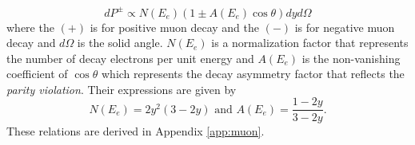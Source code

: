 \documentclass{outhesis}
\begin{document}
\begin{equation}
dP^{\pm} \propto N\left(E_e\right)\left(1 \pm A(E_e)\cos \theta \right) dy d\Omega
\label{eq:prob}
\end{equation}
where the $(+)$ is for positive muon decay and the $(-)$ is for negative muon decay and $d\Omega$ is the solid angle. $N\left(E_e\right)$ is a normalization factor that represents the number of decay electrons per unit energy and $A\left(E_e\right)$ is the non-vanishing coefficient of $\cos \theta$ which represents the decay asymmetry factor that reflects the \emph{parity violation}. Their expressions are given by
\begin{equation}
N\left(E_e\right) = 2y^2\left(3-2y\right)  \,\,  \text{and}  \,\,  A\left(E_e\right) = \frac{1-2y}{3-2y}.
\label{eq:na}
\end{equation}
These relations are derived in Appendix \ref{app:muon}.
\end{document}
